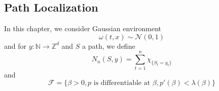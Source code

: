 \begin{proposition}
    
\end{proposition}

\subsection{Path Localization}

\begin{definition}
    In this chapter, we consider Gaussian environment
    \[
    \omega(t,x) \sim \mathcal{N}(0,1)
    \]
    and for $y:\mathbb{N}\to\mathbb{Z}^d$ and $S$ a path, we define
    \[
    N_n(S,y) = \sum\limits_{t=1}^n \chi_{\{S_t = y_t\}}
    \]
    and
    \[\mathcal{F} = \{\beta > 0, p\text{ is differentiable at }\beta,p'(\beta) < \lambda(\beta)\}\]
\end{definition}

